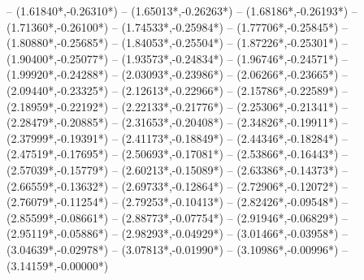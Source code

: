 {	-- ({1.61840*\dx},{-0.26310*\dy})
	-- ({1.65013*\dx},{-0.26263*\dy})
	-- ({1.68186*\dx},{-0.26193*\dy})
	-- ({1.71360*\dx},{-0.26100*\dy})
	-- ({1.74533*\dx},{-0.25984*\dy})
	-- ({1.77706*\dx},{-0.25845*\dy})
	-- ({1.80880*\dx},{-0.25685*\dy})
	-- ({1.84053*\dx},{-0.25504*\dy})
	-- ({1.87226*\dx},{-0.25301*\dy})
	-- ({1.90400*\dx},{-0.25077*\dy})
	-- ({1.93573*\dx},{-0.24834*\dy})
	-- ({1.96746*\dx},{-0.24571*\dy})
	-- ({1.99920*\dx},{-0.24288*\dy})
	-- ({2.03093*\dx},{-0.23986*\dy})
	-- ({2.06266*\dx},{-0.23665*\dy})
	-- ({2.09440*\dx},{-0.23325*\dy})
	-- ({2.12613*\dx},{-0.22966*\dy})
	-- ({2.15786*\dx},{-0.22589*\dy})
	-- ({2.18959*\dx},{-0.22192*\dy})
	-- ({2.22133*\dx},{-0.21776*\dy})
	-- ({2.25306*\dx},{-0.21341*\dy})
	-- ({2.28479*\dx},{-0.20885*\dy})
	-- ({2.31653*\dx},{-0.20408*\dy})
	-- ({2.34826*\dx},{-0.19911*\dy})
	-- ({2.37999*\dx},{-0.19391*\dy})
	-- ({2.41173*\dx},{-0.18849*\dy})
	-- ({2.44346*\dx},{-0.18284*\dy})
	-- ({2.47519*\dx},{-0.17695*\dy})
	-- ({2.50693*\dx},{-0.17081*\dy})
	-- ({2.53866*\dx},{-0.16443*\dy})
	-- ({2.57039*\dx},{-0.15779*\dy})
	-- ({2.60213*\dx},{-0.15089*\dy})
	-- ({2.63386*\dx},{-0.14373*\dy})
	-- ({2.66559*\dx},{-0.13632*\dy})
	-- ({2.69733*\dx},{-0.12864*\dy})
	-- ({2.72906*\dx},{-0.12072*\dy})
	-- ({2.76079*\dx},{-0.11254*\dy})
	-- ({2.79253*\dx},{-0.10413*\dy})
	-- ({2.82426*\dx},{-0.09548*\dy})
	-- ({2.85599*\dx},{-0.08661*\dy})
	-- ({2.88773*\dx},{-0.07754*\dy})
	-- ({2.91946*\dx},{-0.06829*\dy})
	-- ({2.95119*\dx},{-0.05886*\dy})
	-- ({2.98293*\dx},{-0.04929*\dy})
	-- ({3.01466*\dx},{-0.03958*\dy})
	-- ({3.04639*\dx},{-0.02978*\dy})
	-- ({3.07813*\dx},{-0.01990*\dy})
	-- ({3.10986*\dx},{-0.00996*\dy})
	-- ({3.14159*\dx},{-0.00000*\dy})
}
